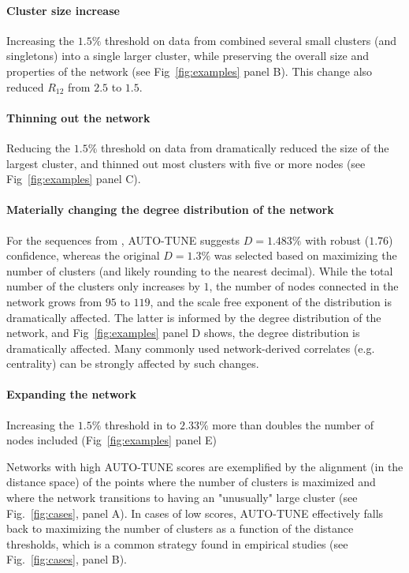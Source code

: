 \documentclass[utf8]{FrontiersinHarvard} %
\begin{document}
\paragraph{Cluster size increase}  Increasing the $1.5\%$ threshold on data from \citet{Little:2014aa} combined
several small clusters (and singletons) into a single larger cluster, while
preserving the overall size and properties of the network (see
Fig~\ref{fig:examples} panel B). This change also reduced $R_{12}$ from
$2.5$ to $1.5$.

\paragraph{Thinning out the network}  Reducing the $1.5\%$ threshold on data from \citet{rhee_national_2019}
dramatically reduced the size of the largest cluster, and thinned out most
clusters with five or more nodes (see Fig~\ref{fig:examples} panel C).

\paragraph{Materially changing the degree distribution of the network}  For the sequences from \citet{Li:2022aa}, AUTO-TUNE suggests $D = 1.483\%$ with
robust ($1.76$) confidence, whereas the original $D = 1.3\%$ was selected based
on maximizing the number of clusters (and likely rounding to the nearest
decimal). While the total number of the clusters only increases by $1$, the
number of nodes connected in the network grows from $95$ to $119$, and the
scale free exponent of the distribution is dramatically affected. The latter is
informed by the degree distribution of the network, and
Fig~\ref{fig:examples} panel D shows, the degree distribution is
dramatically affected. Many commonly used network-derived correlates (e.g.
centrality) can be strongly affected by such changes.

\paragraph{Expanding the network}  Increasing the $1.5\%$ threshold in \citet{Billings:2019aa} to $2.33\%$ more
than doubles the number of nodes included (Fig~\ref{fig:examples} panel E)

Networks with high AUTO-TUNE scores are exemplified by the alignment (in the
distance space) of the points where the number of clusters is maximized and
where the network transitions to having an "unusually" large cluster (see
Fig.~\ref{fig:cases}, panel A). In cases of low scores, AUTO-TUNE
effectively falls back to maximizing the number of clusters as a function of
the distance thresholds, which is a common strategy found in empirical studies
(see Fig.~\ref{fig:cases}, panel B).
\end{document}
